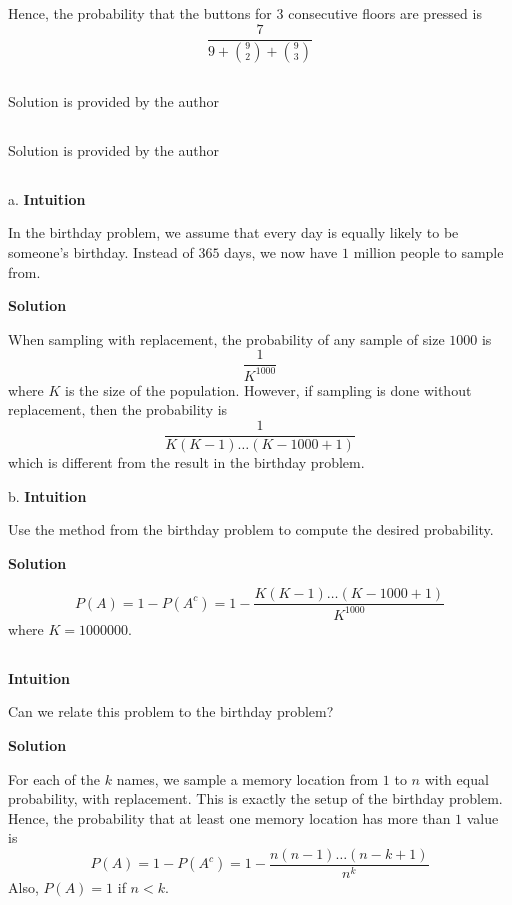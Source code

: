 \documentclass[]{book}
\begin{document}
Hence, the probability that the buttons for \(3\) consecutive floors are
pressed is \[\frac{7}{9 + {9 \choose 2} + {9 \choose 3}}\]

\subsection{}\label{section-23}

Solution is provided by the author

\subsection{}\label{section-24}

Solution is provided by the author

\subsection{}\label{section-25}

a. \textbf{Intuition}

In the birthday problem, we assume that every day is equally likely to
be someone's birthday. Instead of \(365\) days, we now have \(1\)
million people to sample from.

 \textbf{Solution}

When sampling with replacement, the probability of any sample of size
\(1000\) is \[\frac{1}{K^{1000}}\] where \(K\) is the size of the
population. However, if sampling is done without replacement, then the
probability is \[\frac{1}{K(K-1) \dots (K-1000+1)}\] which is different
from the result in the birthday problem.

b. \textbf{Intuition}

Use the method from the birthday problem to compute the desired
probability.

 \textbf{Solution}

\[P(A) = 1 - P(A^{c}) = 1 - \frac{K(K-1) \dots (K-1000+1)}{K^{1000}}\]
where \(K = 1000000\).

\subsection{}\label{section-26}

\textbf{Intuition}

Can we relate this problem to the birthday problem?

 \textbf{Solution}

For each of the \(k\) names, we sample a memory location from \(1\) to
\(n\) with equal probability, with replacement. This is exactly the
setup of the birthday problem. Hence, the probability that at least one
memory location has more than \(1\) value is
\[P(A) = 1 - P(A^{c}) = 1 - \frac{n(n-1) \dots (n-k+1)}{n^{k}}\] Also,
\(P(A) = 1\) if \(n < k\).


\end{document}
